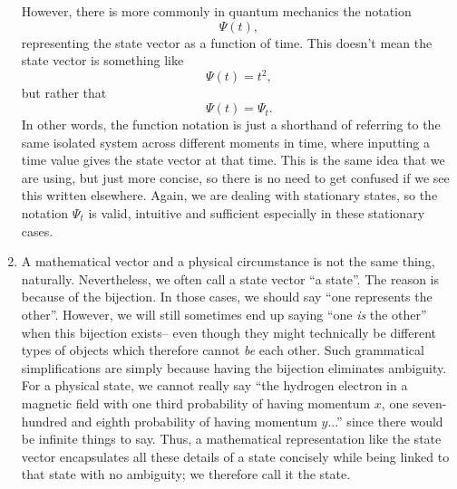 \begin{enumerate}
    \\\\
    However, there is more commonly in quantum mechanics the notation
    $$
    \Psi(t),
    $$
    representing the state vector as a function of time. This doesn't mean the state vector is something like 
    $$
    \Psi(t)=t^2,
    $$
    but rather that 
    $$
    \Psi(t)=\Psi_{t}.
    $$
    In other words, the function notation is just a shorthand of referring to the same isolated system across different moments in time, where inputting a time value gives the state vector at that time. This is the same idea that we are using, but just more concise, so there is no need to get confused if we see this written elsewhere. Again, we are dealing with stationary states, so the notation 
    $\Psi_{t}$ is valid, intuitive and sufficient especially in these stationary cases.
    \item A mathematical vector and a physical circumstance is not the same thing, naturally. Nevertheless, we often call a state vector ``a state''. The reason is because of the bijection. In those cases, we should say ``one represents the other''. However, we will still sometimes end up saying ``one \textit{is} the other'' when this bijection exists-- even though they might technically be different types of objects which therefore cannot \textit{be} each other. Such grammatical simplifications are simply because having the bijection eliminates ambiguity. For a physical state, we cannot really say ``the hydrogen electron in a magnetic field with one third probability of having momentum $x$, one seven-hundred and eighth probability of having momentum $y$...'' since there would be infinite things to say. Thus, a mathematical representation like the state vector encapsulates all these details of a state concisely while being linked to that state with no ambiguity; we therefore call it the state. 
    \\\\

\end{enumerate}
